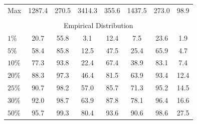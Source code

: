 \begin{center}
\begin{tabular*}{\textwidth}{@{\extracolsep{\fill}}lccccccc}
Max        & 1287.4& 270.5& 3414.3& 355.6& 1437.5& 273.0& 98.9\\ 
 \multicolumn{8}{c}{}\\ 
 \multicolumn{8}{c}{Empirical Distribution}\\ 
 \midrule 
$1\%$      & 20.7& 55.8& 3.1& 12.4& 7.5& 23.6& 1.9\\ 
$5\%$      & 58.4& 85.8& 12.5& 47.5& 25.4& 65.9& 4.7\\ 
$10\%$     & 77.3& 93.8& 22.4& 67.4& 38.9& 83.1& 7.4\\ 
$20\%$     & 88.3& 97.3& 46.4& 81.5& 63.9& 93.4& 12.4\\ 
$25\%$     & 90.7& 98.2& 57.0& 85.7& 71.3& 95.2& 14.5\\ 
$30\%$     & 92.0& 98.7& 63.9& 87.8& 78.1& 96.4& 16.6\\ 
$50\%$     & 95.7& 99.3& 80.4& 93.6& 90.6& 98.6& 27.5\\ 
\bottomrule 
\end{tabular*} 
\end{center}
